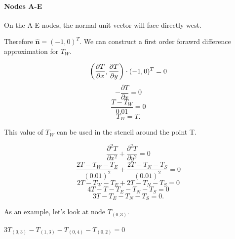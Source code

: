 \documentclass[12pt,a4paper]{article}
\begin{document}
\paragraph*{Nodes A-E}
On the A-E nodes, the normal unit vector will face directly west.
\begin{center}
\end{center}
Therefore $\hat{\textbf{n}} = (-1,0)^T$. We can construct a first order forawrd difference approximation for $T_W$.
\begin{center}
\[\bigg{(}\frac{\partial T}{\partial x},\frac{\partial T}{\partial y}\bigg{)}\cdot (-1,0)^T = 0\]
\[-\frac{\partial T}{\partial x} = 0\]
\[\frac{T-T_W}{0.01} = 0\]
\[T_W = T.\]
\end{center}
This value of $T_W$ can be used in the stencil around the point T.
\begin{center}
\[\frac{\partial^2 T}{\partial x^2}+\frac{\partial^2 T}{\partial y^2}=0\]
\[\frac{2T-T_W-T_E}{(0.01)^2}+\frac{2T-T_N-T_S}{(0.01)^2}=0\]
\[2T-T_W-T_E+2T-T_N-T_S=0\]
\[4T-T-T_E-T_N-T_S=0\]
\[3T-T_E-T_N-T_S=0.\]
\end{center}

As an example, let's look at node $T_{(0, 3)}$. 
\begin{center}
  $3T_{(0,3)}-T_{(1,3)}-T_{(0,4)}-T_{(0,2)}=0$
\end{center}
\end{document}
